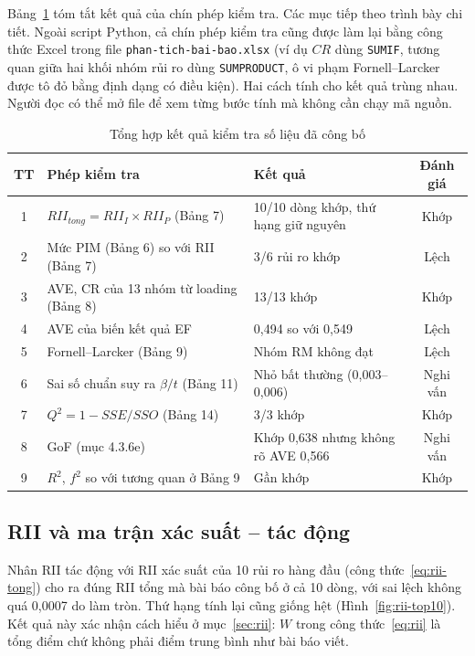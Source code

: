 Bảng~\ref{tab:tong-hop-kiem-tra} tóm tắt kết quả của chín phép kiểm tra. Các mục tiếp theo trình bày chi tiết. Ngoài script Python, cả chín phép kiểm tra cũng được làm lại bằng công thức Excel trong file \texttt{phan-tich-bai-bao.xlsx} (ví dụ $CR$ dùng \texttt{SUMIF}, tương quan giữa hai khối nhóm rủi ro dùng \texttt{SUMPRODUCT}, ô vi phạm Fornell--Larcker được tô đỏ bằng định dạng có điều kiện). Hai cách tính cho kết quả trùng nhau. Người đọc có thể mở file để xem từng bước tính mà không cần chạy mã nguồn.

\begin{table}[H]
\centering
\caption{Tổng hợp kết quả kiểm tra số liệu đã công bố}
\label{tab:tong-hop-kiem-tra}
\begin{tabularx}{\textwidth}{@{}clXc@{}}
\toprule
\textbf{TT} & \textbf{Phép kiểm tra} & \textbf{Kết quả} & \textbf{Đánh giá} \\
\midrule
1 & $RII_{tong} = RII_I \times RII_P$ (Bảng 7) & 10/10 dòng khớp, thứ hạng giữ nguyên & Khớp \\
2 & Mức PIM (Bảng 6) so với RII (Bảng 7) & 3/6 rủi ro khớp & Lệch \\
3 & AVE, CR của 13 nhóm từ loading (Bảng 8) & 13/13 khớp & Khớp \\
4 & AVE của biến kết quả EF & 0,494 so với 0,549 & Lệch \\
5 & Fornell--Larcker (Bảng 9) & Nhóm RM không đạt & Lệch \\
6 & Sai số chuẩn suy ra $\beta / t$ (Bảng 11) & Nhỏ bất thường (0,003--0,006) & Nghi vấn \\
7 & $Q^2 = 1 - SSE/SSO$ (Bảng 14) & 3/3 khớp & Khớp \\
8 & GoF (mục 4.3.6e) & Khớp 0,638 nhưng không rõ AVE 0,566 & Nghi vấn \\
9 & $R^2$, $f^2$ so với tương quan ở Bảng 9 & Gần khớp & Khớp \\
\bottomrule
\end{tabularx}
\end{table}

\subsection{RII và ma trận xác suất -- tác động}
\label{sec:kt-rii}

Nhân RII tác động với RII xác suất của 10 rủi ro hàng đầu (công thức~\eqref{eq:rii-tong}) cho ra đúng RII tổng mà bài báo công bố ở cả 10 dòng, với sai lệch không quá 0,0007 do làm tròn. Thứ hạng tính lại cũng giống hệt (Hình~\ref{fig:rii-top10}). Kết quả này xác nhận cách hiểu ở mục~\ref{sec:rii}: $W$ trong công thức~\eqref{eq:rii} là tổng điểm chứ không phải điểm trung bình như bài báo viết.

